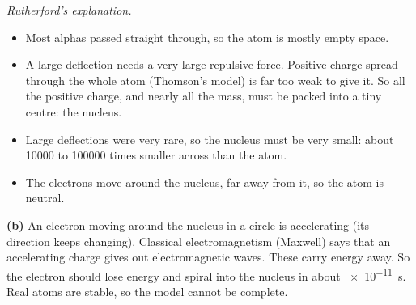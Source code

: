 \begin{practiceanswers}
\begin{practiceans}
\begin{modelanswer}
  \emph{Rutherford's explanation.}
  \begin{itemize}
    \item Most alphas passed straight through, so the atom is mostly empty space.
    \item A large deflection needs a very large repulsive force. Positive charge spread
          through the whole atom (Thomson's model) is far too weak to give it. So all the
          positive charge, and nearly all the mass, must be packed into a tiny centre: the
          nucleus.
    \item Large deflections were very rare, so the nucleus must be very small: about
          \num{10000} to \num{100000} times smaller across than the atom.
    \item The electrons move around the nucleus, far away from it, so the atom is neutral.
  \end{itemize}

  \textbf{(b)} An electron moving around the nucleus in a circle is accelerating (its
  direction keeps changing). Classical electromagnetism (Maxwell) says that an accelerating
  charge gives out electromagnetic waves. These carry energy away. So the electron should
  lose energy and spiral into the nucleus in about \qty{e-11}{s}. Real atoms are stable,
  so the model cannot be complete.
  \end{modelanswer}
  \begin{markingcriteria}
  \end{markingcriteria}
\end{practiceans}


\end{practiceanswers}
